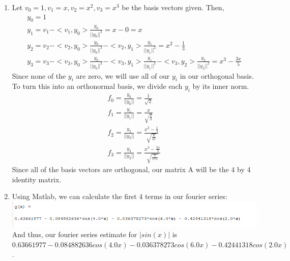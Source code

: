\documentclass{article}
\begin{document}
\begin{enumerate}
    \item Let $v_0 = 1, v_1 = x, v_2 = x^2, v_3 = x^3$ be the basis vectors given. 
    Then, 
    \begin{gather*}
        y_0 = 1\\
        y_1 = v_1 - <v_1, y_0>\frac{y_0}{||y_0||^2} = x - 0 = x\\
        y_2 = v_2 - <v_2, y_0>\frac{y_0}{||y_0||^2} - <v_2, y_1>\frac{y_1}{||y_1||^2} = x^2 - \frac{1}{3}\\
        y_3 = v_3 - <v_3, y_0>\frac{y_0}{||y_0||^2} - <v_3, y_1>\frac{y_1}{||y_1||^2} - <v_3, y_2>\frac{y_2}{||y_2||^2} = x^3 - \frac{3x}{5}
    \end{gather*}
    Since none of the $y_i$ are zero, we will use all of our $y_i$ in our orthogonal basis. 
    To turn this into an orthonormal basis, we divide each $y_i$ by its inner norm.
    \begin{gather*}
        f_0 = \frac{y_0}{||y_0||} = \frac{1}{\sqrt{2}}\\
        f_1 = \frac{y_1}{||y_1||} = \frac{x}{\sqrt{\frac{2}{3}}}\\
        f_2 = \frac{y_2}{||y_2||} = \frac{x^2 - \frac{1}{3}}{\sqrt{\frac{8}{45}}}\\
        f_3 = \frac{y_3}{||y_3||} = \frac{x^3 - \frac{3x}{5}}{\sqrt{\frac{8}{175}}}
    \end{gather*}
    Since all of the basis vectors are orthogonal, our matrix A will be the 4 by 4
    identity matrix. 

    \item Using Matlab, we can calculate the first 4 terms in our fourier series: \\
    \includegraphics[scale = .9]{5.png}\\
    And thus, our fourier series estimate for $|sin(x)|$ is 
    $0.63661977 - 0.084882636cos(4.0x) - 0.036378273cos(6.0x) - 0.42441318cos(2.0x)$. 
    

\end{enumerate}
\end{document}
